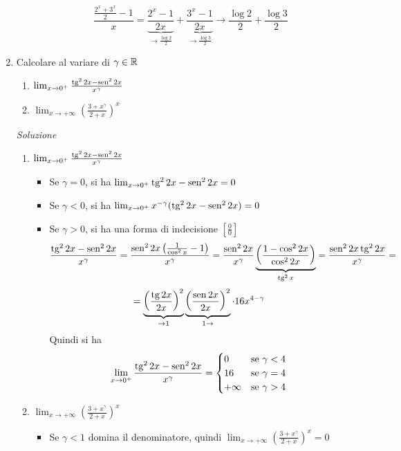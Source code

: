 \documentclass{article}
\begin{document}
\begin{enumerate}[label=\textbf{Esercizio 6.\arabic*.},itemindent=*]
\begin{enumerate}
        \[\frac{\frac{2^x+3^x}{2}-1}{x}=\underbrace{\frac{2^x-1}{2x}}_{\to\frac{\log2}{2}}+\underbrace{\frac{3^x-1}{2x}}_{\to\frac{\log3}{2}}\to \frac{\log2}{2}+\frac{\log3}{2}\]
    \end{enumerate}
    \item Calcolare al variare di $\gamma\in \mathbb{R}$
    \begin{enumerate}
        \item $\lim_{x\to 0^+}\frac{\operatorname{tg}^22x-\operatorname{sen}^22x}{x^\gamma}$
        \item $\lim_{x\to +\infty}\left( \frac{3+x^\gamma}{2+x} \right)^x$
    \end{enumerate}
    \item[\textit{\large Soluzione~}]~
    \begin{enumerate}
        \item $\lim_{x\to 0^+}\frac{\operatorname{tg}^22x-\operatorname{sen}^22x}{x^\gamma}$
        \begin{itemize}
            \item Se $\gamma=0$, si ha $\lim_{x\to 0^+}{\operatorname{tg}^22x-\operatorname{sen}^22x}=0$
            \item Se $\gamma<0$, si ha $\lim_{x\to 0^+}{x^{-\gamma}(\operatorname{tg}^22x-\operatorname{sen}^22x)}=0$
            \item Se $\gamma>0$, si ha una forma di indecisione $\left[ \frac{0}{0} \right]$
            \[
                \frac{\operatorname{tg}^22x-\operatorname{sen}^22x}{x^\gamma}=\frac{\operatorname{sen}^22x\left( \frac{1}{\cos^2x}-1 \right)}{x^\gamma}=\frac{\operatorname{sen}^22x}{x^\gamma}\underbrace{\left( \frac{1-\cos^22x}{\cos^22x} \right)}_{\operatorname{tg}^2 x}=\frac{\operatorname{sen}^22x\operatorname{tg}^22x}{x^\gamma}=
            \]
            \[
                =\underbrace{\left( \frac{\operatorname{tg}2x}{2x} \right)^2}_{\to1}\underbrace{\left( \frac{\operatorname{sen}2x}{2x}\right)^2}_{1\to}\cdot 16x^{4-\gamma}
            \]
            Quindi si ha
            \[\lim_{x\to 0^+}\frac{\operatorname{tg}^22x-\operatorname{sen}^22x}{x^\gamma}=\begin{cases}
                0&\text{se }\gamma<4\\
                16&\text{se }\gamma=4\\
                +\infty&\text{se }\gamma >4\\
            \end{cases}\]
        \end{itemize}
        \item $\lim_{x\to +\infty}\left( \frac{3+x^\gamma}{2+x} \right)^x$
        \begin{itemize}
            \item Se $\gamma<1$ domina il denominatore, quindi $\lim_{x\to +\infty}\left( \frac{3+x^\gamma}{2+x} \right)^x=0$

\end{itemize}
\end{enumerate}
\end{enumerate}
\end{document}
